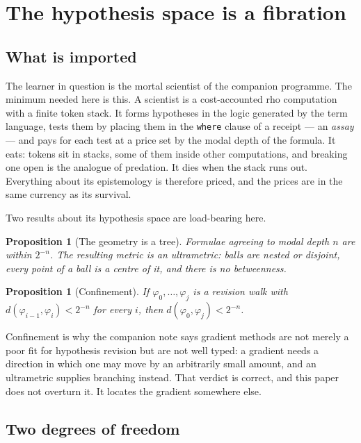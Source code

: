 \documentclass[11pt,a4paper]{article}
\theoremstyle{plain}
\newtheorem{proposition}[theorem]{Proposition}
\theoremstyle{definition}
\theoremstyle{remark}
\newcommand{\rhoc}{\textsf{rho}}
\begin{document}
\section{The hypothesis space is a fibration}\label{sec:fibration}

\subsection{What is imported}

The learner in question is the mortal scientist of the companion programme. The
minimum needed here is this. A scientist is a cost-accounted \rhoc{} computation
with a finite token stack. It forms hypotheses in the logic generated by the term
language, tests them by placing them in the \texttt{where} clause of a receipt
--- an \emph{assay} --- and pays for each test at a price set by the modal depth
of the formula. It eats: tokens sit in stacks, some of them inside other
computations, and breaking one open is the analogue of predation. It dies when
the stack runs out. Everything about its epistemology is therefore priced, and
the prices are in the same currency as its survival.

Two results about its hypothesis space are load-bearing here.

\begin{proposition}[The geometry is a tree]\label{prop:tree}
Formulae agreeing to modal depth $n$ are within $2^{-n}$. The resulting metric is
an ultrametric: balls are nested or disjoint, every point of a ball is a centre
of it, and there is no betweenness.
\end{proposition}

\begin{proposition}[Confinement]\label{prop:confinement}
If $\varphi_0,\dots,\varphi_j$ is a revision walk with
$d(\varphi_{i-1},\varphi_i) < 2^{-n}$ for every $i$, then
$d(\varphi_0,\varphi_j) < 2^{-n}$.
\end{proposition}

Confinement is why the companion note says gradient methods are not merely a poor
fit for hypothesis revision but are not well typed: a gradient needs a direction
in which one may move by an arbitrarily small amount, and an ultrametric supplies
branching instead. That verdict is correct, and this paper does not overturn it.
It locates the gradient somewhere else.

\subsection{Two degrees of freedom}
\end{document}
